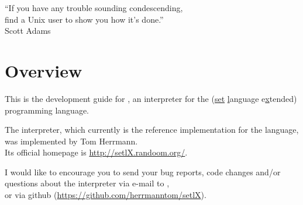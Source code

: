 


\globalDate{\today}






\begin{titlepage}
\maketitle

\vfill

\begin{center}
\Large
``If you have any trouble sounding condescending,\\
find a Unix user to show you how it's done.''\\
Scott Adams
\end{center}

\vfill
\end{titlepage}

\tableofcontents

\newpage

\section{Overview}

This is the development guide for \setlX, an interpreter for the \SetlX{} (\underline{set} \underline{l}anguage e\underline{x}tended) programming language.

The \setlX{} interpreter, which currently is the reference implementation for the \SetlX{} language, was implemented by Tom Herrmann.\\
Its official homepage is \url{http://setlX.randoom.org/}.

I would like to encourage you to send your bug reports, code changes and\slash{}or questions about the \setlX{} interpreter via e-mail to ,\\
or via github (\url{https://github.com/herrmanntom/setlX}).

